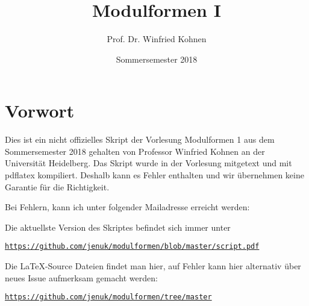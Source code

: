 \documentclass[parskip=half]{scrbook}
\title{Modulformen I}
\author{Prof. Dr. Winfried Kohnen}
\date{Sommersemester 2018}
\begin{document}
\pagestyle{plain}

\maketitle

\chapter*{Vorwort}

Dies ist ein nicht offizielles Skript der Vorlesung Modulformen 1 aus dem Sommersemester 2018 gehalten von Professor Winfried Kohnen an der Universität Heidelberg.
Das Skript wurde in der Vorlesung mitgetext und mit pdflatex kompiliert.
Deshalb kann es Fehler enthalten und wir übernehmen keine Garantie für die Richtigkeit.

Bei Fehlern, kann ich unter folgender Mailadresse erreicht werden:

\begin{center}
\end{center}

Die aktuellste Version des Skriptes befindet sich immer unter
\begin{center}
\texttt{\url{https://github.com/jenuk/modulformen/blob/master/script.pdf}}
\end{center}

Die \LaTeX-Source Dateien findet man hier, auf Fehler kann hier alternativ über neues Issue aufmerksam gemacht werden:
\begin{center}
\texttt{\url{https://github.com/jenuk/modulformen/tree/master}}
\end{center}

\clearpage
{}
{}
\tableofcontents

\clearpage
{}
\setcounter{page}{0}
\pagestyle{fancy}












\printindex

\cleardoublepage
{}
{}
\listoftheorems[ignoreall, onlynamed={satz,satz-list,satz-noind,satz-ind}]
\end{document}
